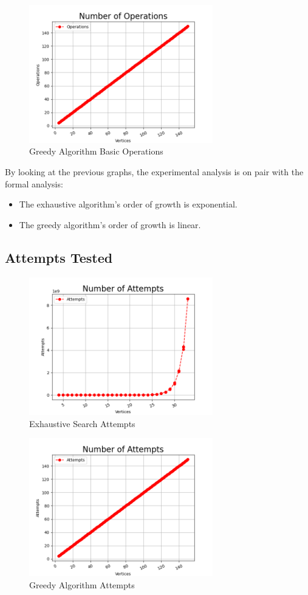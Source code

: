 \documentclass[]{revdetua}
\begin{document}
\begin{figure}[h]
    \centering
    \includegraphics[width=8cm]{operations_greedy.png}
    \caption{Greedy Algorithm Basic Operations}
\end{figure}

By looking at the previous graphs, the experimental analysis is on pair with the formal analysis:

\begin{itemize}
\item The exhaustive algorithm's order of growth is exponential.
\item The greedy algorithm's order of growth is linear.
\end{itemize}

\subsection{Attempts Tested}

\begin{figure}[h]
    \centering
    \includegraphics[width=8cm]{attempts_exhaustive.png}
    \caption{Exhaustive Search Attempts}
\end{figure}

\begin{figure}[h]
    \centering
    \includegraphics[width=8cm]{attempts_greedy.png}
    \caption{Greedy Algorithm Attempts}
\end{figure}
\end{document}
